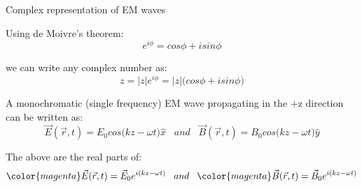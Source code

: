 
%
%
%

\begin{frame}{Complex representation of EM waves}

Using de Moivre's theorem:
\begin{equation*}
   e^{i\phi} = cos\phi + i sin\phi
\end{equation*}

we can write any complex number as:
\begin{equation*}
    z =  |z|  e^{i \phi} = |z| \Big( cos\phi + i sin\phi \Big)
\end{equation*}

A monochromatic (single frequency) EM wave propagating in the +z
direction can be written as:
\begin{equation*}
    \vec{E}(\vec{r},t) = E_0 cos\Big(kz-\omega t \Big) \hat{x} \;\;\; and \;\;\;
    \vec{B}(\vec{r},t) = B_0 cos\Big(kz-\omega t \Big) \hat{y}
\end{equation*}

The above are the real parts of:
\begin{equation*}
    {\color{magenta} \vec{E}(\vec{r},t) = \vec{E}_0  e^{i (kz-\omega t)}  }
    \;\;\; and \;\;\;
    {\color{magenta} \vec{B}(\vec{r},t) = \vec{B}_0  e^{i (kz-\omega t)}  }
\end{equation*}

\end{frame}



%
%
%


%
%
%

